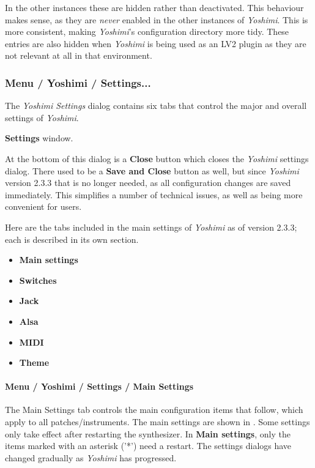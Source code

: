    In the other instances these are hidden rather than deactivated.  This
   behaviour makes sense, as they are \textsl{never} enabled in the other
   instances of \textsl{Yoshimi}. This is more consistent, making
   \textsl{Yoshimi}'s configuration directory more tidy. These entries are
   also hidden when \textsl{Yoshimi} is being used as an LV2 plugin as they
   are not relevant at all in that environment.

\subsubsection{Menu / Yoshimi / Settings...}
\label{subsubsec:menu_yoshimi_settings}

   The \textsl{Yoshimi Settings} dialog contains six tabs that control the
   major and overall settings of \textsl{Yoshimi}.

   \textbf{Settings} window.

   At the bottom of this dialog is a \textbf{Close} button which closes the
   \textsl{Yoshimi} settings dialog. There used to be a \textbf{Save and Close}
   button as well, but since \textsl{Yoshimi} version 2.3.3 that is no longer
   needed, as all configuration changes are saved immediately. This simplifies
   a number of technical issues, as well as being more convenient for users.

   Here are the tabs included in the main settings of \textsl{Yoshimi}
   as of version 2.3.3; each is described in its own section.

   \begin{itemize}
      \item \textbf{Main settings}
      \item \textbf{Switches}
      \item \textbf{Jack}
      \item \textbf{Alsa}
      \item \textbf{MIDI}
      \item \textbf{Theme}
   \end{itemize}

\paragraph{Menu / Yoshimi / Settings / Main Settings}
\label{paragraph:menu_yoshimi_settings_main_settings}

   The Main Settings tab controls the main configuration items that
   follow, which apply to all patches/instruments.
   The main settings are shown in
   .
   Some settings only take effect after restarting the synthesizer.
   In \textbf{Main settings}, only the items marked with an asterisk ('*')
   need a restart.
   The settings dialogs have changed gradually as
   \textsl{Yoshimi} has progressed.

